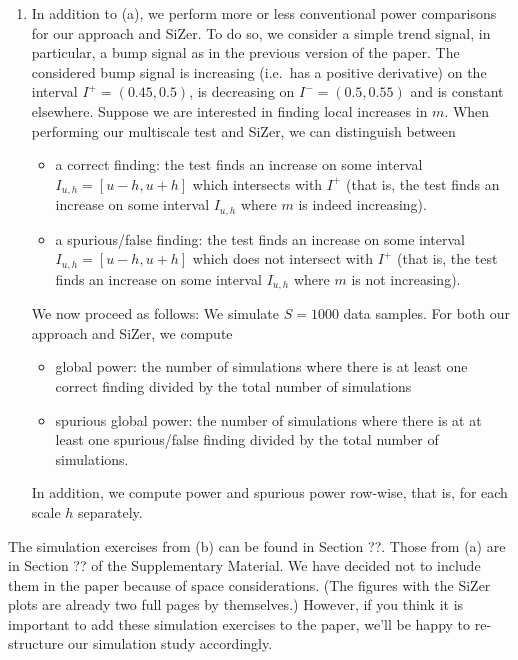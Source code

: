 \documentclass[a4paper,12pt]{article}
\begin{document}
\begin{enumerate}[label=(\arabic*),leftmargin=0.8cm]
\begin{enumerate}[label=(\alph*), leftmargin=0.7cm]
\item In addition to (a), we perform more or less conventional power comparisons for our approach and SiZer. To do so, we consider a simple trend signal, in particular, a bump signal as in the previous version of the paper. The considered bump signal is increasing (i.e.\ has a positive derivative) on the interval $I^+ = (0.45,0.5)$, is decreasing on $I^- = (0.5,0.55)$ and is constant elsewhere. Suppose we are interested in finding local increases in $m$. When performing our multiscale test and SiZer, we can distinguish between 
\begin{itemize}[leftmargin=0.5cm,itemsep=0cm]
\item a correct finding: the test finds an increase on some interval $I_{u,h} = [u-h,u+h]$ which intersects with $I^+$ (that is, the test finds an increase on some interval $I_{u,h}$ where $m$ is indeed increasing).
\item a spurious/false finding: the test finds an increase on some interval $I_{u,h} = [u-h,u+h]$ which does not intersect with $I^+$ (that is, the test finds an increase on some interval $I_{u,h}$ where $m$ is not increasing).
\end{itemize}
We now proceed as follows: We simulate $S=1000$ data samples. For both our approach and SiZer, we compute 
\begin{itemize}[leftmargin=0.5cm,itemsep=0cm]
\item global power: the number of simulations where there is at least one correct finding divided by the total number of simulations
\item spurious global power: the number of simulations where there is at at least one spurious/false finding divided by the total number of simulations.
\end{itemize}
In addition, we compute power and spurious power row-wise, that is, for each scale $h$ separately. 

\end{enumerate}
The simulation exercises from (b) can be found in Section ??. Those from (a) are in Section ?? of the Supplementary Material. We have decided not to include them in the paper because of space considerations. (The figures with the SiZer plots are already two full pages by themselves.) However, if you think it is important to add these simulation exercises to the paper, we'll be happy to re-structure our simulation study accordingly. 


\end{enumerate}
\end{document}

